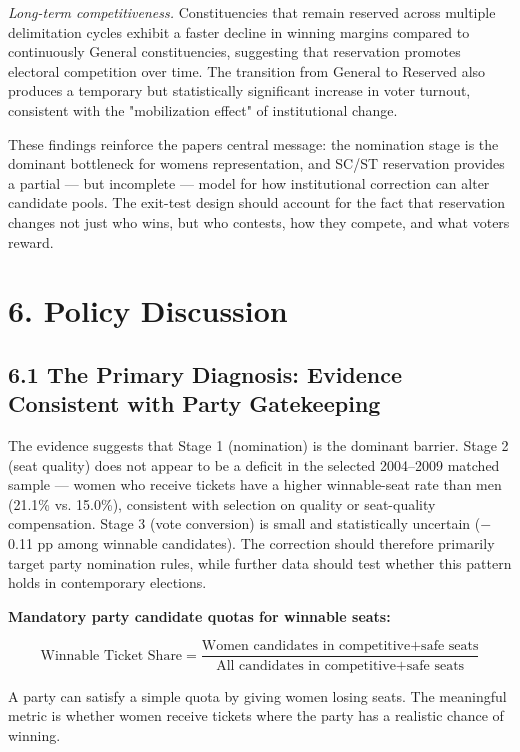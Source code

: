 \documentclass[
]{article}
\begin{document}
\emph{Long-term competitiveness.} Constituencies that remain reserved across multiple delimitation cycles exhibit a faster decline in winning margins compared to continuously General constituencies, suggesting that reservation promotes electoral competition over time. The transition from General to Reserved also produces a temporary but statistically significant increase in voter turnout, consistent with the "mobilization effect" of institutional change.

These findings reinforce the paper\textquotesingle s central message: the nomination stage is the dominant bottleneck for women\textquotesingle s representation, and SC/ST reservation provides a partial --- but incomplete --- model for how institutional correction can alter candidate pools. The exit-test design should account for the fact that reservation changes not just who wins, but who contests, how they compete, and what voters reward.

\section{6. Policy Discussion}\label{6-policy-discussion}

\subsection{6.1 The Primary Diagnosis: Evidence Consistent with Party Gatekeeping}\label{61-the-primary-diagnosis-evidence-consistent-with-party-gatekeeping}

The evidence suggests that Stage 1 (nomination) is the dominant barrier. Stage 2 (seat quality) does not appear to be a deficit in the selected 2004--2009 matched sample --- women who receive tickets have a higher winnable-seat rate than men (21.1\% vs. 15.0\%), consistent with selection on quality or seat-quality compensation. Stage 3 (vote conversion) is small and statistically uncertain ($-$0.11 pp among winnable candidates). The correction should therefore primarily target party nomination rules, while further data should test whether this pattern holds in contemporary elections.

\textbf{Mandatory party candidate quotas for winnable seats:}

\[\text{Winnable Ticket Share} = \frac{\text{Women candidates in competitive+safe seats}}{\text{All candidates in competitive+safe seats}}\]

A party can satisfy a simple quota by giving women losing seats. The meaningful metric is whether women receive tickets where the party has a realistic chance of winning.
\end{document}
